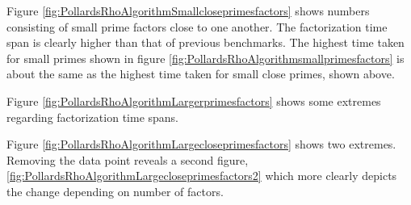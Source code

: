 



Figure \ref{fig:PollardsRhoAlgorithmSmallcloseprimesfactors} shows numbers consisting of small prime factors close to one another. The factorization time span is clearly higher than that of previous benchmarks. The highest time taken for small primes shown in figure \ref{fig:PollardsRhoAlgorithmsmallprimesfactors} is about the same as the highest time taken for small close primes, shown above.



Figure \ref{fig:PollardsRhoAlgorithmLargerprimesfactors} shows some extremes regarding factorization time spans.



Figure \ref{fig:PollardsRhoAlgorithmLargecloseprimesfactors} shows two extremes. Removing the data point reveals a second figure, \ref{fig:PollardsRhoAlgorithmLargecloseprimesfactors2} which more clearly depicts the change depending on number of factors.

